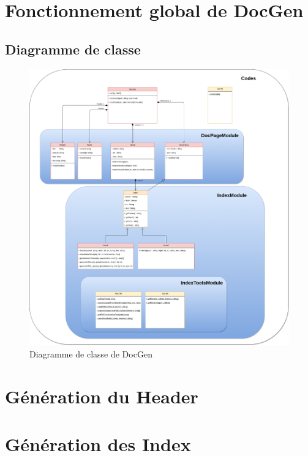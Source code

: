 \documentclass[./standalone.tex]{subfiles}
\begin{document}
	
\chapter{Fonctionnement global de DocGen}

\section{Diagramme de classe}

\begin{figure}[h!]
	\centering
	\includegraphics[scale=0.225]{../DocGen.png}
	\caption{Diagramme de classe de DocGen}
	\label{fig:indexT}
\end{figure}


\chapter{Génération du Header}


\chapter{Génération des Index}
\end{document}
